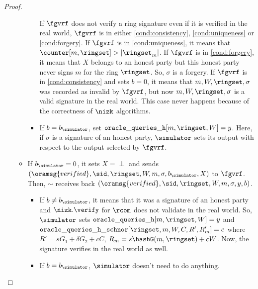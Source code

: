 \begin{proof}
\begin{itemize}
\begin{itemize}
\begin{itemize}
				If $ \fgvrf $ does not verify a ring signature even if  it is verified in the real world, $ \fgvrf $ is in either \ref{cond:consistency}, \ref{cond:uniqueness} or \ref{cond:forgery}.
				If $ \fgvrf $ is in \ref{cond:uniqueness}, it means that $ \counter[m,\ringset] > |\ringset_m| $. If $ \fgvrf $ is in \ref{cond:forgery}, it means that $ X $ belongs to an honest party but this honest party never signs $ m $ for the ring $ \ringset $. So, $ \sigma $ is a forgery.	If $ \fgvrf $ is in  \ref{cond:consistency} and sets $ b =0 $, it means that $ m, W, \ringset, \sigma $ was recorded as invalid by $ \fgvrf $, but now $ m, W, \ringset, \sigma $ is a valid signature in the real world. 
				This case never happens because of the correctness of $ \nizk $ algorithms. 
				
				\item If $ b = b_\simulator $, set $ \mathtt{oracle\_queries\_h}[m, \ringset,W] = y $. Here, if $ \sigma $ is a signature of an honest party, $ \simulator $ sets its output with respect to the output selected by $ \fgvrf $. 
			\end{itemize}
			\item If $ b_\simulator = 0 $, it sets $ X = \perp $ and sends  $ (\oramsg{verified}, \sid, \ringset, W, m, \sigma, b_\simulator, X) $ to $ \fgvrf $. Then, $ \sim $ receives back $ (\oramsg{verified}, \sid, \ringset, W, m, \sigma, y, b) $. 
			\begin{itemize}
				\item If $ b \neq b_\simulator $, it means that it was a signature of an honest party and $ \nizk.\verify $ for $ \rcom $ does not validate in the real world. So, $ \simulator $ sets $ \mathtt{oracle\_queries\_h}[m, \ringset,W] = y $ and $ \mathtt{oracle\_queries\_h\_schnor}[\ringset, m, W, C, R', R_m'] = c $ where $ R' = sG_1 + \delta G_2+ cC  $, $ R_m = s \hashG(m,\ringset) + cW$. 
				Now, the signature verifies in the real world as well.
				\item If $ b = b_\simulator $, $ \simulator $ doesn't need to do anything.
			\end{itemize}
			

\end{itemize}
\end{itemize}
\end{proof}
